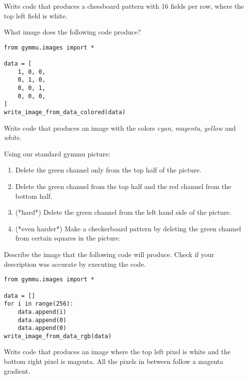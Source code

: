 \documentclass[11pt,a4paper]{report}
\begin{document}
\begin{ex}
Write code that produces a chessboard pattern with 16 fields per row, where the
top left field is white.
\end{ex}

\begin{ex}
What image does the following code produce?
\begin{lstlisting}
from gymmu.images import *

data = [
    1, 0, 0,
    0, 1, 0,
    0, 0, 1,
    0, 0, 0,
]
write_image_from_data_colored(data)
\end{lstlisting}
\end{ex}



\begin{ex}
Write code that produces an image with the colors \emph{cyan}, \emph{magenta},
\emph{yellow} and \emph{white}.
\end{ex}

\begin{ex}
Using our standard gymmu picture:
\begin{enumerate}
\item Delete the green channel only from the top half of the picture.
\item Delete the green channel from the top half and the red channel from the bottom half.
\item (*hard*) Delete the green channel from the left hand side of the picture.
\item (*even harder*) Make a checkerboard pattern by deleting the green channel from certain squares in the picture.
\end{enumerate} 
\end{ex}

\newpage

\begin{ex}
Describe the image that the following code will produce. Check if your
description was accurate by executing the code.
\begin{lstlisting}
from gymmu.images import *

data = []
for i in range(256):
    data.append(i)
    data.append(0)
    data.append(0)
write_image_from_data_rgb(data)
\end{lstlisting}
\end{ex}



\begin{ex}
Write code that produces an image where the top left pixel is white and the
bottom right pixel is magenta. All the pixels in between follow a magenta
gradient.
\end{ex}
\end{document}
